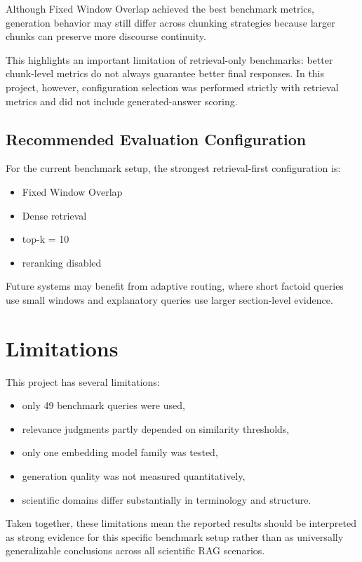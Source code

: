 \documentclass[a4paper,12pt]{article}
\begin{document}
Although Fixed Window Overlap achieved the best benchmark metrics, generation behavior may still differ across chunking strategies because larger chunks can preserve more discourse continuity.

This highlights an important limitation of retrieval-only benchmarks: better chunk-level metrics do not always guarantee better final responses. In this project, however, configuration selection was performed strictly with retrieval metrics and did not include generated-answer scoring.

\subsection{Recommended Evaluation Configuration}

For the current benchmark setup, the strongest retrieval-first configuration is:

\begin{itemize}
    \item Fixed Window Overlap
    \item Dense retrieval
    \item top-k = 10
    \item reranking disabled
\end{itemize}

Future systems may benefit from adaptive routing, where short factoid queries use small windows and explanatory queries use larger section-level evidence.

\newpage

\section{Limitations}

This project has several limitations:

\begin{itemize}
    \item only 49 benchmark queries were used,
    \item relevance judgments partly depended on similarity thresholds,
    \item only one embedding model family was tested,
    \item generation quality was not measured quantitatively,
    \item scientific domains differ substantially in terminology and structure.
\end{itemize}

Taken together, these limitations mean the reported results should be interpreted as strong evidence for this specific benchmark setup rather than as universally generalizable conclusions across all scientific RAG scenarios.
\end{document}
